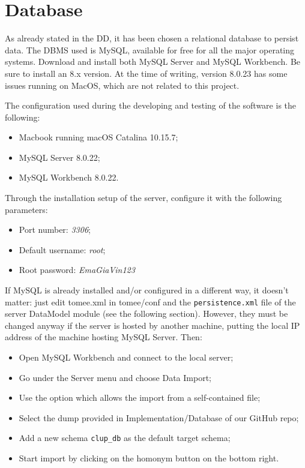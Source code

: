 \documentclass[a4paper,oneside,11pt]{book}
\begin{document}
    \section{Database}
    As already stated in the DD, it has been chosen a relational database to persist data. The DBMS used is MySQL, available for free for all the major operating systems. Download and install both MySQL Server and MySQL Workbench. Be sure to install an 8.x version. At the time of writing, version 8.0.23 has some issues running on MacOS, which are not related to this project. \par
    The configuration used during the developing and testing of the software is the following:
    \begin{itemize}
        \item Macbook running macOS Catalina 10.15.7;
        \item MySQL Server 8.0.22;
        \item MySQL Workbench 8.0.22.
    \end{itemize}
    Through the installation setup of the server, configure it with the following parameters:
    \begin{itemize}
        \item Port number: \textit{3306};
        \item Default username: \textit{root};
        \item Root password: \textit{EmaGiaVin123}
    \end{itemize}
    If MySQL is already installed and/or configured in a different way, it doesn’t matter: just edit tomee.xml in tomee/conf and the \texttt{persistence.xml} file of the server DataModel module (see the following section). However, they must be changed anyway if the server is hosted by another machine, putting the local IP address of the machine hosting MySQL Server. Then:
    \begin{itemize}
        \item Open MySQL Workbench and connect to the local server;
        \item Go under the Server menu and choose Data Import;
        \item Use the option which allows the import from a self-contained file;
        \item Select the dump provided in Implementation/Database of our GitHub repo;
        \item Add a new schema \texttt{clup\_db} as the default target schema;
        \item Start import by clicking on the homonym button on the bottom right.
    \end{itemize}
\end{document}
